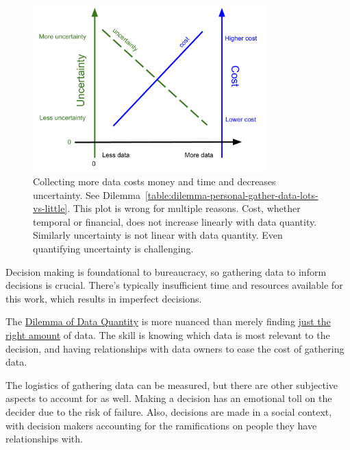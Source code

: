 \begin{figure}[H] %
        \centering
        \includegraphics[width=0.8\textwidth]{images/cost_and_uncertainty_for_data_collection}
        \caption{Collecting more data costs money and time and decreases uncertainty.  See Dilemma~\ref{table:dilemma-personal-gather-data-lots-vs-little}. This plot is wrong for multiple reasons. Cost, whether temporal or financial, does not increase linearly with data quantity. Similarly uncertainty is not linear with data quantity. Even quantifying uncertainty is challenging. }
        \label{fig:data_collection_cost_uncertainty}
\end{figure}



Decision making is foundational to bureaucracy, so gathering data to inform decisions is crucial. There's typically insufficient time and resources available for this work, which results in imperfect decisions. 

The \hyperref[table:dilemma-personal-gather-data-lots-vs-little]{Dilemma of Data Quantity} is more nuanced than merely finding 
\href{https://en.wikipedia.org/wiki/Goldilocks_principle}{just the right amount} of data.
The skill is knowing which data is most relevant to the decision, and having relationships with data owners to ease the cost of gathering data.

The logistics of gathering data can be measured, but there are other subjective aspects to account for as well. Making a decision has an emotional toll on the decider due to the risk of failure. Also, decisions are made in a social context, with decision makers accounting for the ramifications on people they have relationships with. 

